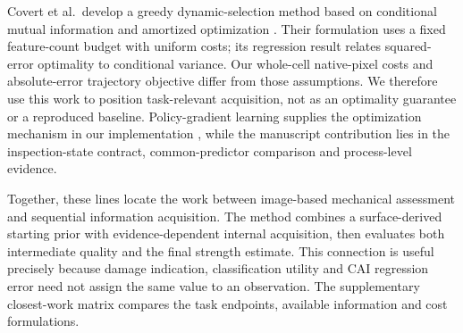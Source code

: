 Covert et al.~develop a greedy dynamic-selection method based on conditional mutual information and amortized optimization \citep{covert2023}. Their formulation uses a fixed feature-count budget with uniform costs; its regression result relates squared-error optimality to conditional variance. Our whole-cell native-pixel costs and absolute-error trajectory objective differ from those assumptions. We therefore use this work to position task-relevant acquisition, not as an optimality guarantee or a reproduced baseline. Policy-gradient learning supplies the optimization mechanism in our implementation \citep{williams1992}, while the manuscript contribution lies in the inspection-state contract, common-predictor comparison and process-level evidence.

Together, these lines locate the work between image-based mechanical assessment and sequential information acquisition. The method combines a surface-derived starting prior with evidence-dependent internal acquisition, then evaluates both intermediate quality and the final strength estimate. This connection is useful precisely because damage indication, classification utility and CAI regression error need not assign the same value to an observation. The supplementary closest-work matrix compares the task endpoints, available information and cost formulations.
